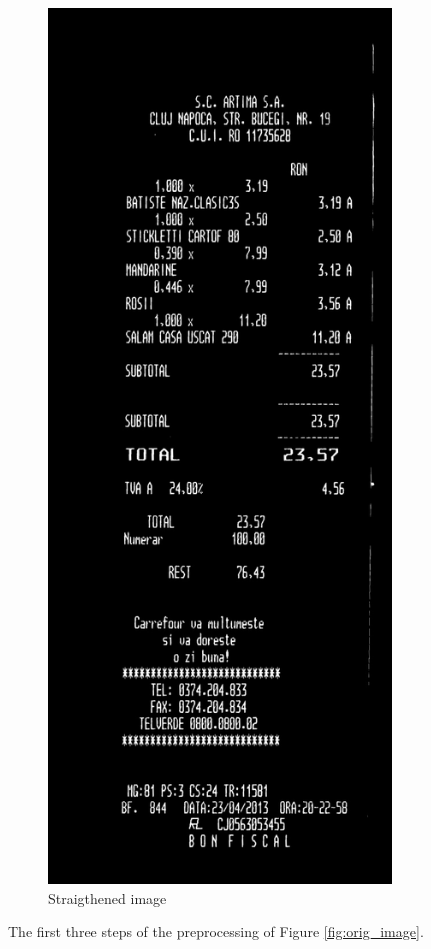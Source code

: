 \begin{figure}
\begin{subfigure}{0.49\linewidth}
  \includegraphics[width=.6\linewidth]{img/straight.jpg}
  \caption{Straigthened image}
  \label{fig:straight_image}
\end{subfigure}
\caption{\label{fig:receipts}
The first three steps of the preprocessing of Figure \ref{fig:orig_image}. }
\end{figure}

